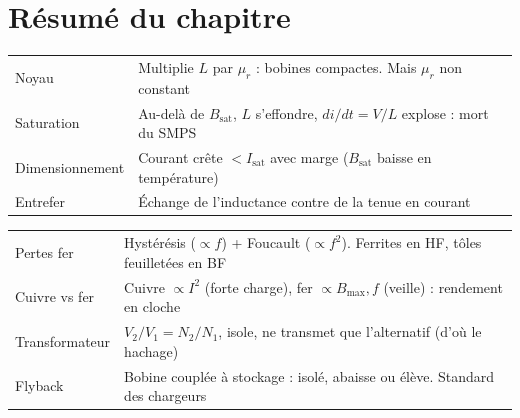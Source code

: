 \documentclass[12pt,a4paper,twoside]{book}
\begin{document}
\section*{Résumé du chapitre}

\begin{bases}[title={\color{white} Résumé --- Les Bases}]
\begin{center}
\renewcommand{\arraystretch}{1.3}
\begin{tabular}{p{3.5cm}p{9.5cm}}
\toprule
Noyau & Multiplie $L$ par $\mu_r$ : bobines compactes. Mais $\mu_r$ non constant \\
Saturation & Au-delà de $B_{\text{sat}}$, $L$ s'effondre, $di/dt = V/L$ explose : mort du SMPS \\
Dimensionnement & Courant crête $< I_{\text{sat}}$ avec marge ($B_{\text{sat}}$ baisse en température) \\
Entrefer & Échange de l'inductance contre de la tenue en courant \\
\bottomrule
\end{tabular}
\end{center}
\end{bases}

\begin{approfondissement}[title={\color{white} Résumé --- Approfondissement}]
\begin{center}
\renewcommand{\arraystretch}{1.3}
\begin{tabular}{p{3.5cm}p{9.5cm}}
\toprule
Pertes fer & Hystérésis ($\propto f$) + Foucault ($\propto f^2$). Ferrites en HF, tôles feuilletées en BF \\
Cuivre vs fer & Cuivre $\propto I^2$ (forte charge), fer $\propto B_{\max}, f$ (veille) : rendement en cloche \\
Transformateur & $V_2/V_1 = N_2/N_1$, isole, ne transmet que l'alternatif (d'où le hachage) \\
Flyback & Bobine couplée à stockage : isolé, abaisse ou élève. Standard des chargeurs \\
\bottomrule
\end{tabular}
\end{center}
\end{approfondissement}
\end{document}
